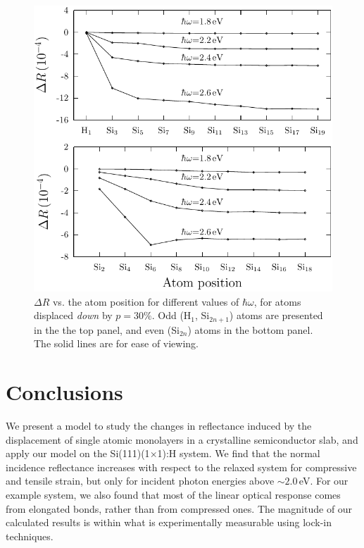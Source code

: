 \documentclass[pss]{wiley2sp} %
\begin{document}
\begin{figure}[b]
\centering
\includegraphics[width=0.9\linewidth]{fig04}
\caption{$\Delta R$ vs. the atom position for different values of $\hbar\omega$,
for atoms displaced \emph{down} by $p = 30\%$. Odd (H$_{1}$, Si$_{2n+1}$) atoms
are presented in the the top panel, and even (Si$_{2n}$) atoms in the bottom
panel. The solid lines are for ease of viewing.}
\label{fig:4}
\end{figure}


\section{Conclusions}\label{sec:conc}

We present a model to study the changes in reflectance induced by the
displacement of single atomic monolayers in a crystalline semiconductor slab,
and apply our model on the Si(111)(1$\times$1):H system. We find that the normal
incidence reflectance increases with respect to the relaxed system for
compressive and tensile strain, but only for incident photon energies above
$\sim2.0$\,eV. For our example system, we also found that most of the linear
optical response comes from elongated bonds, rather than from compressed ones.
The magnitude of our calculated results is within what is experimentally
measurable using lock-in techniques.
\end{document}
